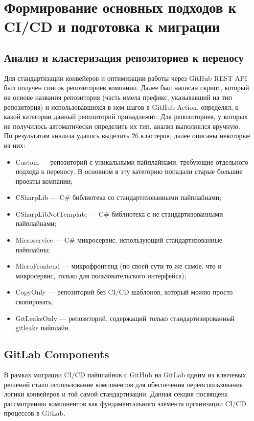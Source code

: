 \chapter{Формирование основных подходов к CI/CD и подготовка к миграции} \label{ch:ch2}

\section{Анализ и кластеризация репозиториев к переносу} \label{sec:repository-analysis}
Для стандартизации конвейеров и оптимизации работы через GitHub REST API\cite{gh-rest-api} был получен список репозиториев компании.
Далее был написан скрипт,
который на основе названия репозитория (часть имела префикс, указывавший на тип репозитория) и использовавшихся в нем шагов в GitHub Action,
определял, к какой категории данный репозиторий принадлежит.
Для репозиториев, у которых не получилось автоматически определить их тип, анализ выполнялся вручную.
По результатам анализа удалось выделить 26 кластеров, далее описаны некоторые из них:
\begin{itemize}
  \item Custom — репозиторий с уникальными пайплайнами, требующие отдельного подхода к переносу.
        В основном в эту категорию попадали старые большие проекты компании;
  \item CSharpLib — C\# библиотека со стандартизованными пайплайнами;
  \item CSharpLibNotTemplate — C\# библиотека с не стандартизованными пайплайнами;
  \item Microservice — C\# микросервис, использующий стандартизованные пайплайны;
  \item MicroFrontend — микрофронтенд (по своей сути то же самое, что и микросервис, только для пользовательского интерфейса);
  \item CopyOnly — репозиторий без CI/CD шаблонов, который можно просто скопировать;
  \item GitLeaksOnly — репозиторий, содержащий только стандартизированный gitleaks пайплайн.
\end{itemize}

\section{GitLab Components} \label{sec:gl-components}
В рамках миграции CI/CD пайплайнов с GitHub на GitLab одним из ключевых решений стало использование компонентов
для обеспечения переиспользования логики конвейеров и той самой стандартизации.
Данная секция посвящена рассмотрению компонентов как фундаментального элемента организации CI/CD процессов в GitLab.

